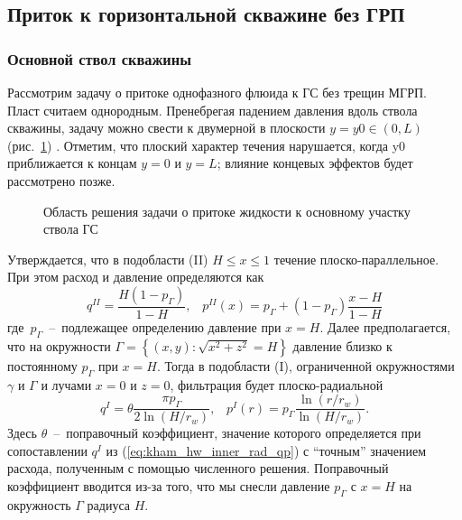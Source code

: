 \documentclass{article}
\begin{document}

\subsection{Приток к горизонтальной скважине без ГРП}

\subsubsection{Основной ствол скважины}
Рассмотрим задачу о притоке однофазного флюида к ГС без трещин МГРП. Пласт считаем однородным. Пренебрегая падением давления вдоль ствола скважины, задачу можно свести к двумерной в плоскости $y = y0 \in \left(0, L\right)$ (рис.~\ref{fig:kham_well_pipe_scheme}) . Отметим, что плоский характер течения нарушается, когда y0 приближается к концам $y = 0$ и $y = L$; влияние концевых эффектов будет рассмотрено позже.

\begin{figure}[!ht]
  \centering
  
  \caption{Область решения задачи о притоке жидкости к основному участку ствола ГС}
  \label{fig:kham_well_pipe_scheme}
\end{figure}

Утверждается, что в подобласти (II) $H \leq x \leq 1$ течение плоско-параллельное. При этом расход и давление определяются как
\begin{equation}
  \displaystyle
  q^{II} = \dfrac{H \left(1-p_{\Gamma}\right)}{1-H}, \;\;\;
  p^{II}(x) = p_{\Gamma} + (1 - p_{\Gamma})\dfrac{x - H}{1-H}
  \label{eq:kham_hw_inner_par_qp}
\end{equation}
где~$p_{\Gamma}$~--~подлежащее определению давление при $x=H$.
Далее предполагается, что на окружности $\Gamma=\left\{\left(x,y\right): \sqrt{x^2 + z^2} = H \right\}$ давление близко к постоянному $p_{\Gamma}$ при $x=H$.
Тогда в подобласти (I), ограниченной окружностями $\gamma$ и $\Gamma$ и лучами $x = 0$ и $z = 0$, фильтрация будет плоско-радиальной
\begin{equation}
  \displaystyle
  q^I = \theta \dfrac{\pi p_{\Gamma}}{2 \ln{\left(H/r_w\right)}}, \;\;\;
  p^I(r) = p_{\Gamma} \dfrac{\ln{\left(r/r_w\right)}}{\ln{\left(H/r_w\right)}}.
  \label{eq:kham_hw_inner_rad_qp}
\end{equation}
Здесь $\theta$~--~поправочный коэффициент, значение которого определяется при сопоставлении $q^I$ из (\ref{eq:kham_hw_inner_rad_qp}) с ``точным'' значением расхода, полученным с помощью численного решения. Поправочный коэффициент вводится из-за того, что мы снесли давление $p_{\Gamma}$ с $x= H$ на окружность $\Gamma$ радиуса $H$.
\end{document}
